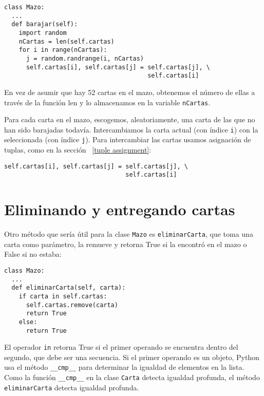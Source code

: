 \begin{lstlisting}
class Mazo:
  ...
  def barajar(self):
    import random
    nCartas = len(self.cartas)
    for i in range(nCartas):
      j = random.randrange(i, nCartas)
      self.cartas[i], self.cartas[j] = self.cartas[j], \
                                       self.cartas[i]
\end{lstlisting}
 En vez de asumir que hay 52 cartas en el mazo, obtenemos el número
de ellas a través de la función len y lo almacenamos en la variable
\texttt{nCartas}.

  

Para cada carta en el mazo, escogemos, aleatoriamente, una carta de
las que no han sido barajadas todavía. Intercambiamos la carta actual
(con índice \texttt{i}) con la seleccionada (con índice \texttt{j}).
Para intercambiar las cartas usamos asignación de tuplas, como en
la sección ~\ref{tuple assignment}:\inputencoding{latin9}
\begin{lstlisting}
self.cartas[i], self.cartas[j] = self.cartas[j], \
                                 self.cartas[i]
\end{lstlisting}
\inputencoding{utf8}
\section{Eliminando y entregando cartas}


Otro método que sería útil para la clase \texttt{Mazo} es \texttt{eliminarCarta},
que toma una carta como parámetro, la remueve y retorna True si la
encontró en el mazo o False si no estaba:

\begin{lstlisting}
class Mazo:
  ...
  def eliminarCarta(self, carta):
    if carta in self.cartas:
      self.cartas.remove(carta)
      return True
    else: 
      return True
\end{lstlisting}
 El operador \texttt{in} retorna True si el primer operando se encuentra
dentro del segundo, que debe ser una secuencia. Si el primer operando
es un objeto, Python usa el método \texttt{\_\_cmp\_\_} para determinar
la igualdad de elementos en la lista. Como la función \texttt{\_\_cmp\_\_}
en la clase \texttt{Carta} detecta igualdad profunda, el método \texttt{eliminarCarta}
detecta igualdad profunda.

